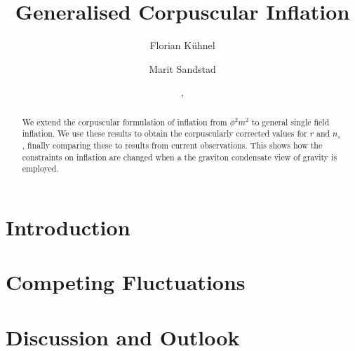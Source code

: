 \documentclass[aps, prd, preprint, superscriptaddress, tightenlines, nofootinbib]{revtex4}
\begin{document}
\title{\bf Generalised Corpuscular Inflation}

\author{Florian K{\"u}hnel}

\author{Marit Sandstad}

\date{\formatdate{\day}{\month}{\year}, \currenttime}

\begin{abstract}
We extend the corpuscular formulation of inflation from $\phi^2m^2$ to general single field inflation. 
We use these results to obtain the corpuscularly corrected values for $r$ and $n_s$, finally comparing
these to results from current observations. This shows how the constraints on inflation are changed 
when a the graviton condensate view of gravity is employed.
\end{abstract}

\maketitle


\section{Introduction}
\label{sec:Introduction}
\setcounter{equation}{0}

\noindent




\section{Competing Fluctuations}
\label{sec:Main-Part}
\setcounter{equation}{0}

\noindent




\section{Discussion and Outlook}
\label{sec:Discussion-and-Outlook}
\setcounter{equation}{0}
\end{document}
